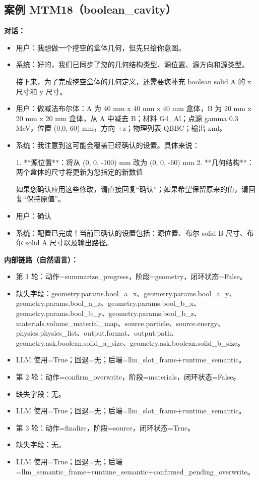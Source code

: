 \documentclass[11pt]{ctexart}
\begin{document}
\subsection{案例 MTM18（boolean\_cavity）}
\textbf{对话：}
\begin{itemize}
\item 用户：我想做一个挖空的盒体几何，但先只给你意图。
\item 系统：好的，我们已同步了您的几何结构类型、源位置、源方向和源类型。

接下来，为了完成挖空盒体的几何定义，还需要您补充 boolean solid A 的 x 尺寸和 y 尺寸。
\item 用户：做减法布尔体：A 为 40 mm x 40 mm x 40 mm 盒体，B 为 20 mm x 20 mm x 20 mm 盒体，从 A 中减去 B；材料 G4\_Al；点源 gamma 0.3 MeV，位置 (0,0,-60) mm，方向 +z；物理列表 QBBC；输出 xml。
\item 系统：我注意到这可能会覆盖已经确认的设置。具体来说：

1. **源位置**：将从 (0, 0, -100) mm 改为 (0, 0, -60) mm
2. **几何结构**：两个盒体的尺寸将更新为您指定的新数值

如果您确认应用这些修改，请直接回复“确认”；如果希望保留原来的值，请回复“保持原值”。
\item 用户：确认
\item 系统：配置已完成！当前已确认的设置包括：源位置、布尔 solid B 尺寸、布尔 solid A 尺寸以及输出路径。
\end{itemize}
\textbf{内部链路（自然语言）：}
\begin{itemize}
\item 第 1 轮：动作=summarize\_progress，阶段=geometry，闭环状态=False。
\item 缺失字段：geometry.params.bool\_a\_x、geometry.params.bool\_a\_y、geometry.params.bool\_a\_z、geometry.params.bool\_b\_x、geometry.params.bool\_b\_y、geometry.params.bool\_b\_z、materials.volume\_material\_map、source.particle、source.energy、physics.physics\_list、output.format、output.path、geometry.ask.boolean.solid\_a\_size、geometry.ask.boolean.solid\_b\_size。
\item LLM 使用=True；回退=无；后端=llm\_slot\_frame+runtime\_semantic。
\item 第 2 轮：动作=confirm\_overwrite，阶段=materials，闭环状态=False。
\item 缺失字段：无。
\item LLM 使用=True；回退=无；后端=llm\_slot\_frame+runtime\_semantic。
\item 第 3 轮：动作=finalize，阶段=source，闭环状态=True。
\item 缺失字段：无。
\item LLM 使用=True；回退=无；后端=llm\_semantic\_frame+runtime\_semantic+confirmed\_pending\_overwrite。
\end{itemize}
\end{document}
